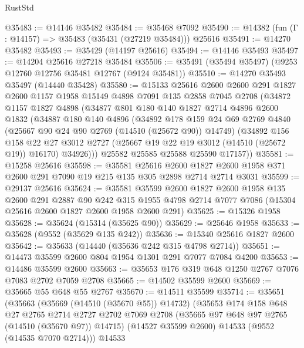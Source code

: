 \begin{lexlean}{RustStd}
\begin{coremodule}
@35483 := @14146 @35482
@35484 := @35468 @7092
@35490 := @14382 (fun (Γ : @14157) => @35483 (@35431 (@27219 @35484))) @25616
@35491 := @14270 @35482
@35493 := @35429 (@14197 @25616)
@35494 := @14146 @35493
@35497 := @14204 @25616 @27218 @35484
@35506 := @35491 (@35494 @35497) (@9253 @12760 @12756 @35481 @12767 (@9124 @35481))
@35510 := @14270 @35493 @35497 (@14440 @35428)
@35580 := @15133
    @25616
    @2600
    @2600
    @291
    @1827
    @2600
    @1157
    @1958
    @15149
    @4898
    @7091
    @135
    @2858
    @7045
    @2708
    (@34872
      @1157
      @1827
      @4898
      (@34877
        @801
        @180
        @140
        @1827
        @2714
        @4896
        @2600
        @1832
        (@34887
          @180
          @140
          @4896
          (@34892
            @178
            @159
            @24
            @69
            @2769
            @4840
            (@25667 @90 @24 @90 @2769 (@14510 (@25672 @90)) @14749)
            (@34892
              @156
              @158
              @22
              @27
              @3012
              @2727
              (@25667 @19 @22 @19 @3012 (@14510 (@25672 @19)) @16170)
              @34926)))
        @25582
        @25585
        @25588
        @25590
        @17157))
@35581 := @15258 @25616
@35598 := @35581
    @25616
    @2600
    @1827
    @2600
    @1958
    @371
    @2600
    @291
    @7090
    @19
    @215
    @135
    @305
    @2898
    @2714
    @2714
    @3031
@35599 := @29137 @25616
@35624 := @35581
    @35599
    @2600
    @1827
    @2600
    @1958
    @135
    @2600
    @291
    @2887
    @90
    @242
    @315
    @1955
    @4798
    @2714
    @7077
    @7086
    (@15304 @25616 @2600 @1827 @2600 @1958 @2600 @291)
@35625 := @15326 @1958
@35628 := @35624 (@15314 (@35625 @90))
@35629 := @25646 @1958
@35633 := @35628 (@9552 (@35629 @135 @242))
@35636 := @15340 @25616 @1827 @2600
@35642 := @35633 (@14440 (@35636 @242 @315 @4798 @2714))
@35651 := @14473 @35599 @2600 @804 @1954 @1301 @291 @7077 @7084 @4200
@35653 := @14486 @35599 @2600
@35663 := @35653 @176 @319 @648 @1250 @2767 @7076 @7083 @2702 @7059 @2708
@35665 := @14502 @35599 @2600
@35669 := @35665 @55 @648 @55 @2767
@35670 := @14511 @35599
@35714 := @35651
    (@35663
      (@35669 (@14510 (@35670 @55)) @14732)
      (@35653
        @174
        @158
        @648
        @27
        @2765
        @2714
        @2727
        @2702
        @7069
        @2708
        (@35665 @97 @648 @97 @2765 (@14510 (@35670 @97)) @14715)
        (@14527 @35599 @2600)
        @14533
        (@9552 (@14535 @7070 @2714)))
      @14533

\end{coremodule}
\end{lexlean}
